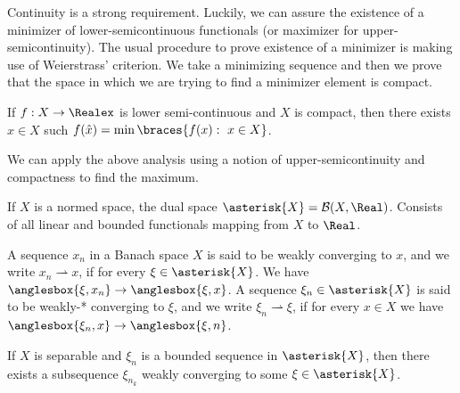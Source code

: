 Continuity is a strong requirement. Luckily, we can assure the existence of a minimizer of lower-semicontinuous functionals (or maximizer for upper-semicontinuity). The usual procedure to prove existence of a minimizer is making use of Weierstrass' criterion. We take a minimizing sequence and then we prove that the space in which we are trying to find a minimizer element is compact.

\begin{theorem}
	If $f: X\rightarrow\Realex$ is lower semi-continuous and $X$ is compact, then there exists $\hat x \in X$ such $f(\hat x)=\min\braces{f(x):\ x\in X}$.
\end{theorem}

We can apply the above analysis using a notion of upper-semicontinuity and compactness to find the maximum.

\begin{definition}
	If $X$ is a normed space, the dual space $\asterisk{X}=\mathcal B(X, \Real)$. Consists of all linear and bounded functionals mapping from $X$ to $\Real$.
\end{definition}

\begin{definition}
	A sequence $x_n$ in a Banach space $X$ is said to be weakly converging to $x$, and we write $x_n \rightharpoonup x$, if for every $\xi \in \asterisk{X}$. We have $\anglesbox{\xi, x_n}\rightarrow \anglesbox{\xi, x}$. A sequence $\xi_n \in \asterisk{X}$ is said to be weakly-* converging to $\xi$, and we write $\xi_n \rightharpoonup \xi$, if for every $x\in X$ we have $\anglesbox{\xi_n, x} \rightarrow \anglesbox{\xi, n}$.
\end{definition}

\begin{theorem}
	If $X$ is separable and $\xi_n$ is a bounded sequence in $\asterisk{X}$, then there exists a subsequence $\xi_{n_k}$ weakly converging to some $\xi \in \asterisk{X}$.
\end{theorem}


